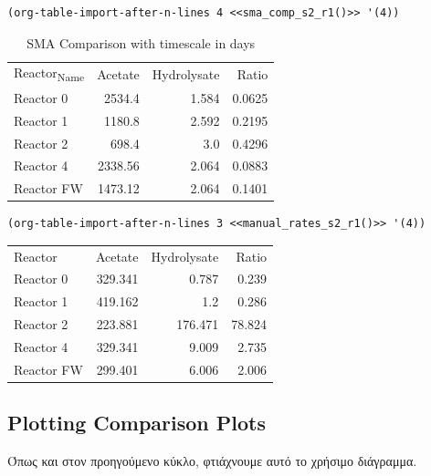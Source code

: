 \documentclass[11pt]{article}
\begin{document}
\begin{verbatim}
(org-table-import-after-n-lines 4 <<sma_comp_s2_r1()>> '(4))
\end{verbatim}

\begin{table}[htbp]
\caption{SMA Comparison with timescale in days}
\centering
\begin{tabular}{lrrr}
Reactor\textsubscript{Name} & Acetate & Hydrolysate & Ratio\\[0pt]
Reactor 0 & 2534.4 & 1.584 & 0.0625\\[0pt]
Reactor 1 & 1180.8 & 2.592 & 0.2195\\[0pt]
Reactor 2 & 698.4 & 3.0 & 0.4296\\[0pt]
Reactor 4 & 2338.56 & 2.064 & 0.0883\\[0pt]
Reactor FW & 1473.12 & 2.064 & 0.1401\\[0pt]
\end{tabular}
\end{table}

\begin{verbatim}
(org-table-import-after-n-lines 3 <<manual_rates_s2_r1()>> '(4))
\end{verbatim}

\begin{center}
\begin{tabular}{lrrr}
Reactor & Acetate & Hydrolysate & Ratio\\[0pt]
Reactor 0 & 329.341 & 0.787 & 0.239\\[0pt]
Reactor 1 & 419.162 & 1.2 & 0.286\\[0pt]
Reactor 2 & 223.881 & 176.471 & 78.824\\[0pt]
Reactor 4 & 329.341 & 9.009 & 2.735\\[0pt]
Reactor FW & 299.401 & 6.006 & 2.006\\[0pt]
\end{tabular}
\end{center}

\subsection{Plotting Comparison Plots}
\label{sec:org30fe3ed}
Όπως και στον προηγούμενο κύκλο, φτιάχνουμε αυτό το χρήσιμο διάγραμμα.
\end{document}
